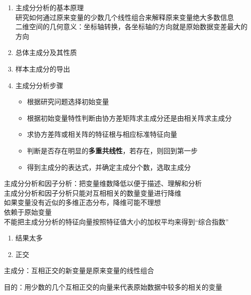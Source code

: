 \documentclass[UTF8,10pt]{book}
\begin{document}
\begin{enumerate}
	\def\labelenumi{\arabic{enumi}.}
	\item
	主成分分析的基本原理\\
	研究如何通过原来变量的少数几个线性组合来解释原来变量绝大多数信息\\
	二维空间的几何意义：坐标轴转换，各坐标轴的方向就是原始数据变差最大的方向
	\item
	总体主成分及其性质
	\item
	样本主成分的导出
	\item
	主成分分析步骤
	
	\begin{itemize}
		\item
		根据研究问题选择初始变量
		\item
		根据初始变量特性判断由协方差矩阵求主成分还是由相关阵求主成分
		\item
		求协方差阵或相关阵的特征根与相应标准特征向量
		\item
		判断是否存在明显的\textbf{多重共线性}，若存在，则回到第一步
		\item
		得到主成分的表达式，并确定主成分个数，选取主成分
	\end{itemize}
\end{enumerate}

主成分分析和因子分析：把变量维数降低以便于描述、理解和分析\\
主成分分析和因子分析只能对互相相关的数量变量进行降维\\
如果变量没有近似的多维正态分布，降维可能不理想\\
依赖于原始变量\\
不能把主成分分析的特征向量按照特征值大小的加权平均来得到``综合指数''

\begin{enumerate}
	\def\labelenumi{\arabic{enumi}.}
	\item
	结果太多
	\item
	正交
\end{enumerate}

主成分：互相正交的新变量是原来变量的线性组合

目的：用少数的几个互相正交的向量来代表原始数据中较多的相关的变量
\end{document}
